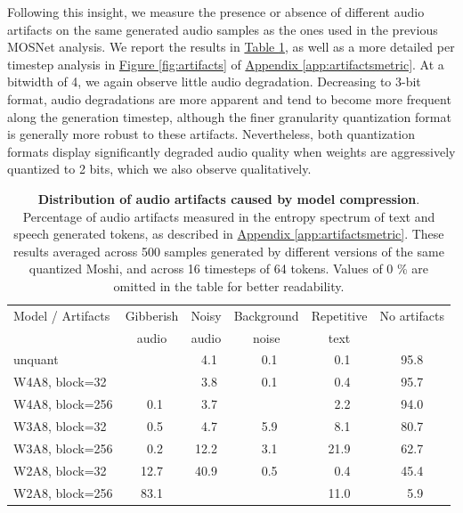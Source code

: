 Following this insight, we measure the presence or absence of different audio artifacts on the same generated audio samples as the ones used in the previous MOSNet analysis. We report the results in \hyperref[tab:artifactssummary]{Table \ref{tab:artifactssummary}}, as well as a more detailed per timestep analysis in \hyperref[fig:artifacts]{Figure \ref{fig:artifacts}} of \hyperref[app:artifactsmetric]{Appendix \ref{app:artifactsmetric}}.
At a bitwidth of 4, we again observe little audio degradation.  
Decreasing to 3-bit format, audio degradations are more apparent and tend to become more frequent along the generation timestep, although the finer granularity quantization format is generally more robust to these artifacts. 
Nevertheless, both quantization formats display significantly degraded audio quality when weights are aggressively quantized to 2 bits, which we also observe qualitatively.

\begin{table}[t]
    \caption{\textbf{Distribution of audio artifacts caused by model compression}. Percentage of audio artifacts measured in the entropy spectrum of text and speech generated tokens, as described in \hyperref[app:artifactsmetric]{Appendix \ref{app:artifactsmetric}}. These results averaged across 500 samples generated by different versions of the same quantized Moshi, and across 16 timesteps of 64 tokens. Values of 0 \% are omitted in the table for better readability.}
    \label{tab:artifactssummary}
    \centering
    \begin{tabular}{lccccc}
        \toprule
        Model / Artifacts & Gibberish  & Noisy  & Background & Repetitive & No artifacts \\
         & audio & audio & noise &  text & \\
         \midrule
         unquant & & \ 4.1 & \ 0.1  &  \ 0.1 & 95.8 \\
         \midrule
         W4A8, block=32 & & \ 3.8  & \ 0.1  & \ 0.4 & 95.7 \\
         W4A8, block=256 & \ 0.1 & \ 3.7 &  & \ 2.2 & 94.0 \\
         \midrule
         W3A8, block=32 & \ 0.5 & \ 4.7 & \ 5.9 & \ 8.1 & 80.7 \\
         W3A8, block=256 & \ 0.2 & 12.2 & \ 3.1  & 21.9 & 62.7 \\
         \midrule
         W2A8, block=32 & 12.7 & 40.9 & \ 0.5 &  \ 0.4 & 45.4 \\
         W2A8, block=256 & 83.1 & & &  11.0 &  \ 5.9 \\
        \bottomrule
    \end{tabular}
\end{table}

